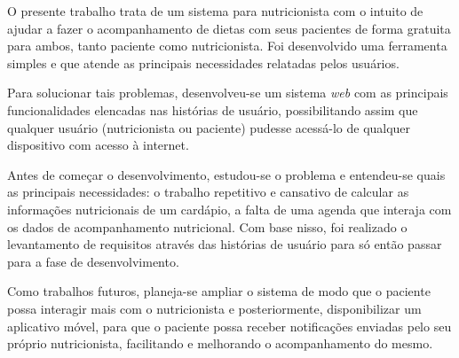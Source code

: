 \documentclass[
	12pt,				%
    oneside,			%
	a4paper,			%
	english,			%
	french,				%
	spanish,			%
	brazil,				%
	]{abntex2}
\begin{document}
O presente trabalho trata de um sistema para nutricionista com o intuito de ajudar a fazer o acompanhamento de dietas com seus pacientes de forma gratuita para ambos, tanto paciente como nutricionista. Foi desenvolvido uma ferramenta simples e que atende as
principais necessidades relatadas pelos usuários.

Para solucionar tais problemas, desenvolveu-se um sistema \textit{web} com as
principais funcionalidades elencadas nas histórias de usuário, possibilitando assim
que qualquer usuário (nutricionista ou paciente) pudesse acessá-lo de qualquer
dispositivo com acesso à internet.

Antes de começar o desenvolvimento, estudou-se o problema e entendeu-se
quais as principais necessidades: o trabalho repetitivo e cansativo de calcular as
informações nutricionais de um cardápio, a falta de uma agenda que interaja com os
dados de acompanhamento nutricional. Com base nisso, foi realizado o levantamento de
requisitos através das histórias de usuário para só então passar para a fase de
desenvolvimento.

Como trabalhos futuros, planeja-se ampliar o sistema de modo que o paciente
possa interagir mais com o nutricionista e posteriormente, disponibilizar um aplicativo
móvel, para que o paciente possa receber notificações enviadas pelo seu próprio
nutricionista, facilitando e melhorando o acompanhamento do mesmo.

\postextual



%
%






\end{document}
